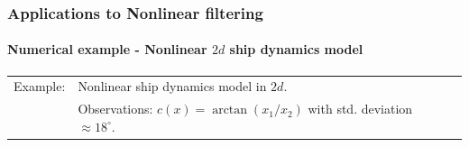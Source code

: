 \documentclass[xcolor=dvipsnames, subsection=false]{beamer}
\def\alertb#1{\alert{\color{BrickRed}  #1}}
\def\alertb#1{\alert{\color{BrickRed}  #1}}
\begin{document}
\begin{frame}
\frametitle{Applications to Nonlinear filtering}
\framesubtitle{Numerical example - Nonlinear $2d$ ship dynamics model}
\begin{minipage}[t][6.5cm][t]{\textwidth}
	
	\begin{tabular}{lll}\alertb{Example:}   & Nonlinear ship dynamics model in $2d$.
		\\
		&   Observations: $c(x) = \arctan(x_1/x_2)$ with std. deviation  $ \approx 18^\circ$.
	\end{tabular}
	
	
	\centering

\end{minipage}
\end{frame}
\end{document}
